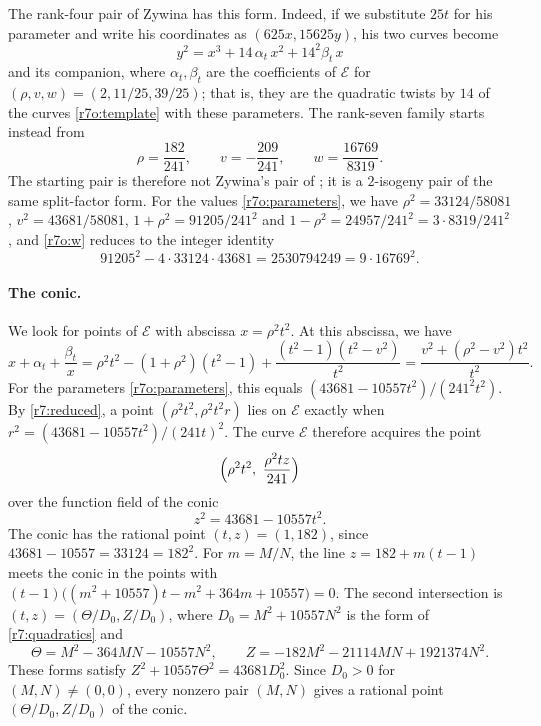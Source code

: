 The rank-four pair of Zywina \cite[\S6.5]{Zywina2026} has this form.
Indeed, if we substitute $25t$ for his parameter and write his coordinates
as $(625x,15625y)$, his two curves become
\[
 y^2=x^3+14\,\alpha_t\,x^2+14^2\beta_t\,x
\]
and its companion, where $\alpha_t,\beta_t$ are the coefficients of
$\mathcal E$ for $(\rho,v,w)=(2,11/25,39/25)$; that is, they are the
quadratic twists by $14$ of the curves \eqref{r7o:template} with these
parameters. %
The rank-seven family starts instead from
\begin{equation}\label{r7o:parameters}
 \rho=\frac{182}{241},\qquad v=-\frac{209}{241},\qquad w=\frac{16769}{8319}.
\end{equation}
The starting pair is therefore not Zywina's pair of \cite[\S6.5]{Zywina2026}; it
is a $2$-isogeny pair of the same split-factor form. For the values
\eqref{r7o:parameters}, we have $\rho^2=33124/58081$,
$v^2=43681/58081$, $1+\rho^2=91205/241^2$ and
$1-\rho^2=24957/241^2=3\cdot8319/241^2$, and \eqref{r7o:w} reduces to the
integer identity
\[
 91205^2-4\cdot33124\cdot43681=2530794249=9\cdot16769^2.
\]

\paragraph{The conic.} We look for points of $\mathcal E$ with abscissa
$x=\rho^2t^2$. At this abscissa, we have
\[
 x+\alpha_t+\frac{\beta_t}x
 =\rho^2t^2-(1+\rho^2)(t^2-1)+\frac{(t^2-1)(t^2-v^2)}{t^2}
 =\frac{v^2+(\rho^2-v^2)t^2}{t^2}.
\]
For the parameters \eqref{r7o:parameters}, this equals
$(43681-10557t^2)/(241^2t^2)$. By \eqref{r7:reduced}, a point
$(\rho^2t^2,\rho^2t^2r)$ lies on $\mathcal E$ exactly when
$r^2=(43681-10557t^2)/(241t)^2$. The curve $\mathcal E$ therefore acquires the
point
\begin{equation}\label{r7o:conic-point}
 \Bigl(\rho^2t^2,\ \frac{\rho^2tz}{241}\Bigr)
\end{equation}
over the function field of the conic
\begin{equation}\label{r7o:conic}
 z^2=43681-10557t^2.
\end{equation}
The conic has the rational point $(t,z)=(1,182)$, since
$43681-10557=33124=182^2$. For $m=M/N$, the line $z=182+m(t-1)$ meets the
conic in the points with
$(t-1)\bigl((m^2+10557)t-m^2+364m+10557\bigr)=0$. The second intersection
is $(t,z)=(\Theta/D_0,Z/D_0)$, where $D_0=M^2+10557N^2$ is the form of
\eqref{r7:quadratics} and
\begin{equation}\label{r7o:Theta}
 \Theta=M^2-364MN-10557N^2,\qquad Z=-182M^2-21114MN+1921374N^2.
\end{equation}
These forms satisfy $Z^2+10557\Theta^2=43681D_0^2$. Since $D_0>0$ for
$(M,N)\ne(0,0)$, every nonzero pair $(M,N)$ gives a rational point
$(\Theta/D_0,Z/D_0)$ of the conic.

